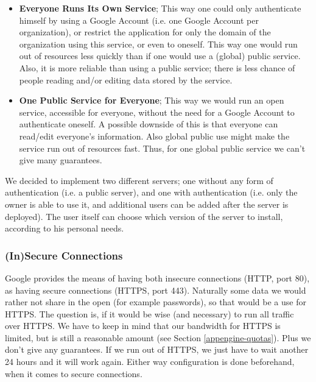 \begin{itemize}
  \item \textbf{Everyone Runs Its Own Service}; This way one could only
  authenticate himself by using a Google Account (i.e. one Google Account per
  organization), or restrict the application for only the domain of the
  organization using this service, or even to oneself. This way one would run out
  of resources less quickly than if one would use a (global) public service.
  Also, it is more reliable than using a public service; there is less chance of
  people reading and/or editing data stored by the service.
  \item \textbf{One Public Service for Everyone}; This way we would run an open
  service, accessible for everyone, without the need for a Google Account to
  authenticate oneself. A possible downside of this is that everyone can
  read/edit everyone's information. Also global public use might make the service
  run out of resources fast. Thus, for one global public service we can't give
  many guarantees.
\end{itemize}

We decided to implement two different servers; one without any form of
authentication (i.e. a public server), and one with authentication (i.e. only the
owner is able to use it, and additional users can be added after the server is
deployed). The user itself can choose which version of the server to install,
according to his personal needs.

\subsubsection{(In)Secure Connections}
Google provides the means of having both insecure connections (HTTP, port 80), as
having secure connections (HTTPS, port 443). Naturally some data we would rather
not share in the open (for example passwords), so that would be a use for HTTPS.
The question is, if it would be wise (and necessary) to run all traffic over
HTTPS. We have to keep in mind that our bandwidth for HTTPS is limited, but is
still a reasonable amount (see Section \ref{appengine-quotas}). Plus we don't
give any guarantees. If we run out of HTTPS, we just have to wait another 24
hours and it will work again. Either way configuration is done beforehand, when
it comes to secure connections.
